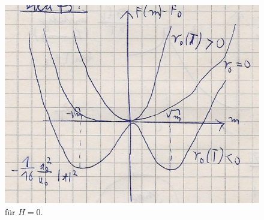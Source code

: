 \begin{figure}[H]
  \centering
  \includegraphics[width = \textwidth]{Zeichnungen/43.pdf}
  \caption{für $H=0$.}
\end{figure}

